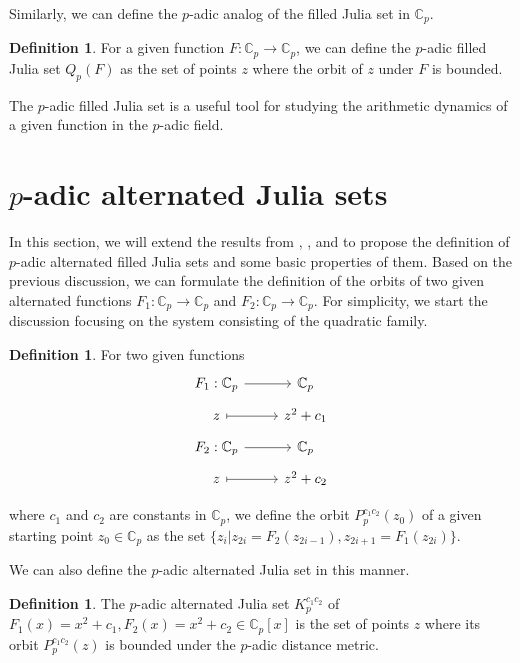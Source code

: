 \documentclass{amsart}
\theoremstyle{plain}
\theoremstyle{definition}
\newtheorem{definition}[theorem]{Definition}
\theoremstyle{remark}
\numberwithin{equation}{section}
\newcommand{\C}{\mathbb{C}}
\begin{document}
Similarly, we can define the $p$-adic analog of the filled Julia set in $\C_p$. 
\begin{definition}
    For a given function $F:\C_p\rightarrow\C_p$, we can define the $p$-adic filled Julia set $Q_p(F)$ as the set of points $z$ where the orbit of $z$ under $F$ is bounded. 
\end{definition}
The $p$-adic filled Julia set is a useful tool for studying the arithmetic dynamics of a given function in the $p$-adic field.
\section{$p$-adic alternated Julia sets}
In this section, we will extend the results from \cite{MR2567586}, \cite{MR3040666}, and \cite{MR3113229} to propose the definition of $p$-adic alternated filled Julia sets and some basic properties of them. Based on the previous discussion, we can formulate the definition of the orbits of two given alternated functions $F_1:\C_p\rightarrow\C_p$ and $F_2:\C_p\rightarrow\C_p.$
For simplicity, we start the discussion focusing on the system consisting of the quadratic family.
\begin{definition}
    For two given functions 
    \[
      \begin{tikzcd}[row sep=tiny]
        F_1: \C_p \arrow[r] & \C_p \\
        z \arrow[r, mapsto] & z^2 + c_1 \end{tikzcd}\]
        \[\begin{tikzcd}[row sep=tiny]
        F_2: \C_p \arrow[r] & \C_p \\
        z \arrow[r, mapsto] & z^2 + c_2 
      \end{tikzcd}\]
    
     where $c_1$ and $c_2$ are constants in $\C_p$, we define the orbit $P^{c_1c_2}_p(z_0)$ of a given starting point $z_0\in\C_p$ as the set $\{z_i|z_{2i} = F_2(z_{2i-1}), z_{2i+1} = F_1(z_{2i})\}$.
\end{definition}
We can also define the $p$-adic alternated Julia set in this manner.
\begin{definition}
    The $p$-adic alternated Julia set $K^{c_1c_2}_p$ of $F_1(x) = x^2+c_1, F_2(x) = x^2+c_2\in\C_p[x]$ is the set of points $z$ where its orbit $P^{c_1c_2}_p(z)$ is bounded under the $p$-adic distance metric. 
\end{definition}
\end{document}

